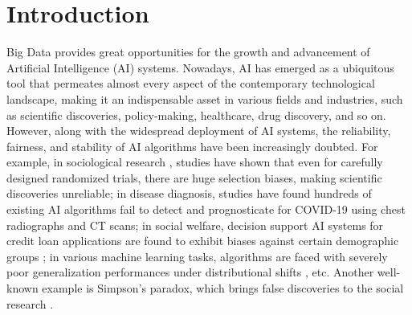 \section{Introduction}






Big Data provides great opportunities for the growth and advancement of Artificial Intelligence (AI) systems. 
Nowadays, AI has emerged as a ubiquitous tool that permeates almost every aspect of the contemporary technological landscape, making it an indispensable asset in various fields and industries, such as scientific discoveries, policy-making, healthcare, drug discovery, and so on.
However, along with the widespread deployment of AI systems, the reliability, fairness, and stability of AI algorithms have been increasingly doubted.
For example, in sociological research \citep{2020Toward}, studies have shown that even for carefully designed randomized trials, there are huge selection biases, making scientific discoveries unreliable; in disease diagnosis, studies \citep{wynants2020prediction, roberts2021common} have found hundreds of existing AI algorithms fail to detect and prognosticate for COVID-19 using chest radiographs and CT scans; in social welfare, decision support AI systems for credit loan applications are found to exhibit biases against certain demographic groups \citep{hardt2016equality, verma2019weapons}; in various machine learning tasks, algorithms are faced with severely poor generalization performances under distributional shifts \citep{shen2021towards}, etc.
Another well-known example is Simpson's paradox, which brings false discoveries to the social research \citep{wagner1982simpson, hernan2011simpson}.


